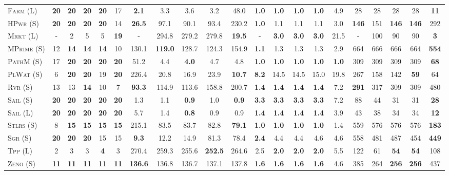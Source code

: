 \documentclass[11pt,landscape]{article}
\begin{document}
\begin{table}[tb]
{\begin{tabular}{|l||ccccc||ccccc||ccccc||ccccc||}
\textsc{Farm} (L)&\textbf{20}&\textbf{20}&\textbf{20}&\textbf{20}&17&\textbf{2.1}&3.3&3.6&3.2&48.0&\textbf{1.0}&\textbf{1.0}&\textbf{1.0}&\textbf{1.0}&4.9&28&28&28&28&\textbf{11}\\
\textsc{HPwr} (S)&\textbf{20}&\textbf{20}&\textbf{20}&\textbf{20}&14&\textbf{26.5}&97.1&90.1&93.4&230.2&\textbf{1.0}&1.1&1.1&1.1&3.0&\textbf{146}&151&\textbf{146}&\textbf{146}&292\\
\textsc{Mrkt} (L)&-&2&5&5&\textbf{19}&-&294.8&279.2&279.8&\textbf{19.5}&-&\textbf{3.0}&\textbf{3.0}&\textbf{3.0}&21.5&-&100&90&90&\textbf{3}\\
\textsc{MPrime} (S)&12&\textbf{14}&\textbf{14}&\textbf{14}&10&130.1&\textbf{119.0}&128.7&124.3&154.9&\textbf{1.1}&1.3&1.3&1.3&2.9&664&666&666&664&\textbf{554}\\
\textsc{PathM} (S)&17&\textbf{20}&\textbf{20}&\textbf{20}&\textbf{20}&51.2&4.4&\textbf{4.0}&4.7&4.8&\textbf{1.0}&\textbf{1.0}&\textbf{1.0}&\textbf{1.0}&\textbf{1.0}&309&309&309&309&\textbf{68}\\
\textsc{PlWat} (S)&6&\textbf{20}&\textbf{20}&19&\textbf{20}&226.4&20.8&16.9&23.9&\textbf{10.7}&\textbf{8.2}&14.5&14.5&15.0&19.8&267&158&142&\textbf{59}&64\\
\textsc{Rvr} (S)&13&13&\textbf{14}&10&7&\textbf{93.3}&114.9&113.6&158.8&200.7&\textbf{1.4}&\textbf{1.4}&\textbf{1.4}&\textbf{1.4}&7.2&\textbf{291}&317&309&309&480\\
\textsc{Sail} (S)&\textbf{20}&\textbf{20}&\textbf{20}&\textbf{20}&\textbf{20}&1.3&1.1&\textbf{0.9}&1.0&\textbf{0.9}&\textbf{3.3}&\textbf{3.3}&\textbf{3.3}&\textbf{3.3}&7.2&88&44&31&31&\textbf{28}\\
\textsc{Sail} (L)&\textbf{20}&\textbf{20}&\textbf{20}&\textbf{20}&\textbf{20}&5.7&1.4&\textbf{0.8}&0.9&0.9&\textbf{1.4}&\textbf{1.4}&\textbf{1.4}&\textbf{1.4}&3.9&43&38&34&34&\textbf{12}\\
\textsc{Stlrs} (S)&8&\textbf{15}&\textbf{15}&\textbf{15}&\textbf{15}&215.1&83.5&83.7&82.8&\textbf{79.1}&\textbf{1.0}&\textbf{1.0}&\textbf{1.0}&\textbf{1.0}&1.4&559&576&576&576&\textbf{183}\\
\textsc{Sgr} (S)&\textbf{20}&\textbf{20}&\textbf{20}&15&15&\textbf{9.3}&12.2&14.9&81.3&78.4&\textbf{2.4}&4.4&4.4&4.6&4.6&558&481&487&454&\textbf{449}\\
\textsc{Tpp} (L)&2&3&3&\textbf{4}&3&270.4&259.3&255.6&\textbf{252.5}&264.6&2.5&\textbf{2.0}&\textbf{2.0}&\textbf{2.0}&5.5&122&61&\textbf{54}&\textbf{54}&108\\
\textsc{Zeno} (S)&\textbf{11}&\textbf{11}&\textbf{11}&\textbf{11}&\textbf{11}&\textbf{136.6}&136.8&136.7&137.1&137.8&\textbf{1.6}&\textbf{1.6}&\textbf{1.6}&\textbf{1.6}&4.6&385&264&\textbf{256}&\textbf{256}&437\\

\end{tabular}}
\end{table}
\end{document}

